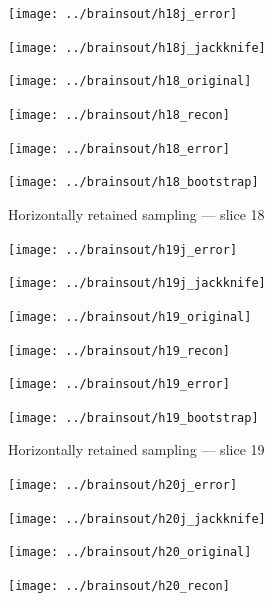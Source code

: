 \documentclass[article]{jdssv}
\begin{document}
\begin{appendix}
\begin{figure}
\begin{centering}
\parbox{\imsize}{\texttt{[image: ../brainsout/h18j\_error]}}
\parbox{\imsize}{\texttt{[image: ../brainsout/h18j\_jackknife]}}

\vspace{\vertsep}

\parbox{\imsize}{\texttt{[image: ../brainsout/h18\_original]}}
\parbox{\imsize}{\texttt{[image: ../brainsout/h18\_recon]}}

\vspace{\vertsep}

\parbox{\imsize}{\texttt{[image: ../brainsout/h18\_error]}}
\parbox{\imsize}{\texttt{[image: ../brainsout/h18\_bootstrap]}}

\end{centering}
\caption{Horizontally retained sampling --- slice 18}
\end{figure}


\begin{figure}
\begin{centering}

\parbox{\imsize}{\texttt{[image: ../brainsout/h19j\_error]}}
\parbox{\imsize}{\texttt{[image: ../brainsout/h19j\_jackknife]}}

\vspace{\vertsep}

\parbox{\imsize}{\texttt{[image: ../brainsout/h19\_original]}}
\parbox{\imsize}{\texttt{[image: ../brainsout/h19\_recon]}}

\vspace{\vertsep}

\parbox{\imsize}{\texttt{[image: ../brainsout/h19\_error]}}
\parbox{\imsize}{\texttt{[image: ../brainsout/h19\_bootstrap]}}

\end{centering}
\caption{Horizontally retained sampling --- slice 19}
\end{figure}


\begin{figure}
\begin{centering}

\parbox{\imsize}{\texttt{[image: ../brainsout/h20j\_error]}}
\parbox{\imsize}{\texttt{[image: ../brainsout/h20j\_jackknife]}}

\vspace{\vertsep}

\parbox{\imsize}{\texttt{[image: ../brainsout/h20\_original]}}
\parbox{\imsize}{\texttt{[image: ../brainsout/h20\_recon]}}

\vspace{\vertsep}


\end{centering}
\end{figure}
\end{appendix}
\end{document}
